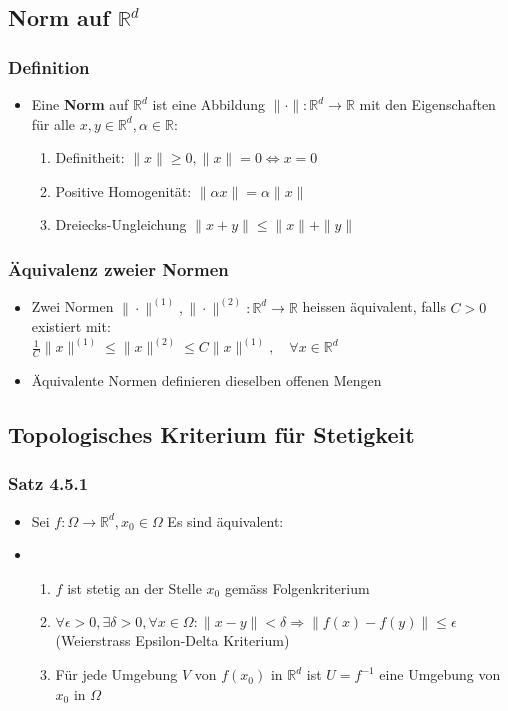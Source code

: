 \documentclass[a3paper, 11pt, landscape]{scrartcl}
\newcommand{\Rd}{\mathbb{R}^d}
\begin{document}
\begin{multicols*}{3}
	\subsection{Norm auf $\Rd$}
	\subsubsection{Definition}
	\begin{itemize}
	    \item Eine \textbf{Norm} auf $\Rd$ ist eine Abbildung $\| \cdot\|:\Rd\to\mathbb{R}$ mit den Eigenschaften für alle $x,y\in\mathbb{R}^d,\alpha\in\mathbb{R}$:\\
	    \begin{enumerate}
	        \item Definitheit: $\| x \|\geq 0, \|x\|=0\iff x=0$
	        \item Positive Homogenität: $\|\alpha x\|=\alpha \|x\|$
	        \item Dreiecks-Ungleichung $\|x+y\|\leq \|x\|+\|y\|$
	    \end{enumerate}
	\end{itemize}
	
	\subsubsection{Äquivalenz zweier Normen}
	\begin{itemize}
	    \item Zwei Normen $\|\cdot\|^{(1)},\|\cdot\|^{(2)}:\Rd\to\mathbb{R}$ heissen äquivalent, falls $C>0$ existiert mit: \\
	    $\frac{1}{C}\|x\|^{(1)}\leq \|x\|^{(2)}\leq C \|x\|^{(1)}, \quad \forall x\in\Rd$\\
	    \item Äquivalente Normen definieren dieselben offenen Mengen
	\end{itemize}
	
	\subsection{Topologisches Kriterium für Stetigkeit}
	\subsubsection{Satz 4.5.1}
	\begin{itemize}
	    \item Sei $f:\Omega\to\mathbb{R}^d, x_0\in\Omega$ Es sind äquivalent:
	    \item \begin{enumerate}
    	    \item $f$ ist stetig an der Stelle $x_0$ gemäss Folgenkriterium
    	    \item $\forall \epsilon>0,\exists \delta>0, \forall x \in \Omega: \|x-y\|<\delta \Rightarrow \|f(x)-f(y)\|\leq \epsilon$ (Weierstrass Epsilon-Delta Kriterium)
    	    \item Für jede Umgebung $V$ von $f(x_0)$ in $\Rd$ ist $U=f^{-1}$ eine Umgebung von $x_0$ in $\Omega$
	\end{enumerate}
	\end{itemize}

\end{multicols*}
\end{document}
